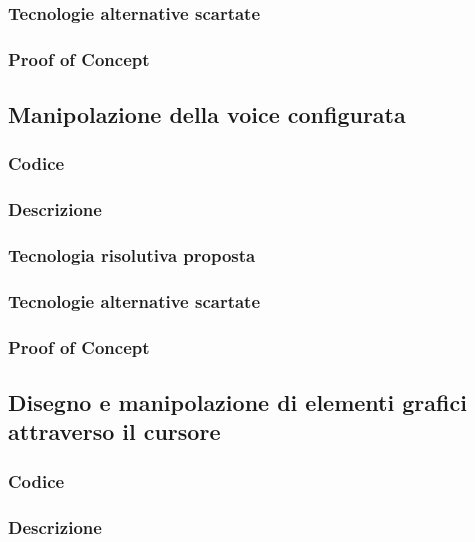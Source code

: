 \documentclass[./../Technology Baseline.tex]{subfiles}
\begin{document}
\subsubsection{Tecnologie alternative scartate}

\subsubsection{Proof of Concept}

\subsection{Manipolazione della voice configurata}

\subsubsection{Codice}

\subsubsection{Descrizione}

\subsubsection{Tecnologia risolutiva proposta}

\subsubsection{Tecnologie alternative scartate}

\subsubsection{Proof of Concept}

\subsection{Disegno e manipolazione di elementi grafici attraverso il cursore}

\subsubsection{Codice}

\subsubsection{Descrizione}
\end{document}
